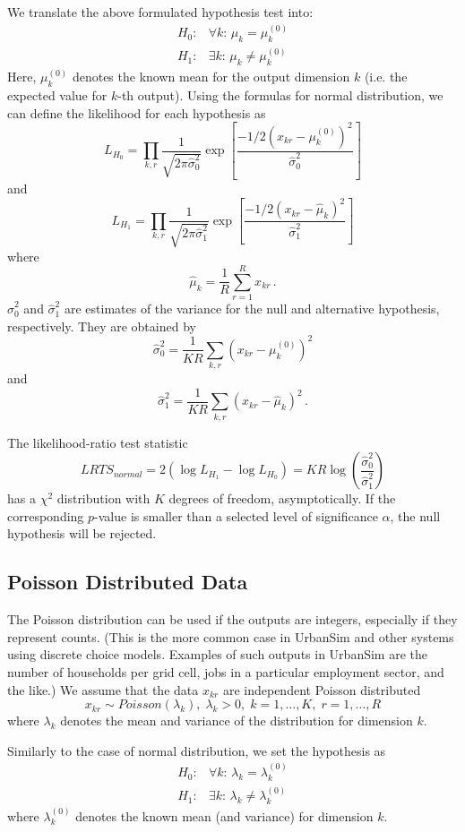 \documentclass{sig-alternate-preprint}
\begin{document}
We translate the above formulated hypothesis test into:
\[
\begin{array}{lc}
H_0: & \forall k: \, \mu_{k} = \mu_{k}^{(0)}\\
H_1: & \exists k: \, \mu_{k} \not= \mu_{k}^{(0)}
\end{array}
\]
Here, $\mu_{k}^{(0)}$ denotes the known mean for the output dimension $k$
(i.e. the expected value for $k$-th output). Using the formulas for normal distribution,
we can define the likelihood for each hypothesis as
\[
L_{H_0} = \prod_{k,r}\frac{1}{\sqrt{2\pi\hat{\sigma}_0^2}} \exp\left[ \frac{-1/2(x_{kr}-\mu_{k}^{(0)})^2}{\hat{\sigma}_0^2}\right]
\]
and
\[
L_{H_1} = \prod_{k,r}\frac{1}{\sqrt{2\pi\hat{\sigma}_1^2}} \exp\left[
  \frac{-1/2(x_{kr}-\hat{\mu}_{k})^2}{\hat{\sigma}_1^2}\right]
\]
where
\[
\hat{\mu}_{k} = \frac{1}{R}\sum_{r=1}^R x_{kr}\,.
\]
$\hat{\sigma}_0^2$ and $\hat{\sigma}_1^2$ are estimates of the
variance for the null and alternative hypothesis, respectively. They are
obtained by
\[
\hat{\sigma}_0^2 = \frac{1}{KR}\sum_{k,r}(x_{kr}-\mu_{k}^{(0)})^2
\]
and
\[
\hat{\sigma}_1^2 = \frac{1}{KR}\sum_{k,r}(x_{kr}-\hat{\mu}_{k})^2\,.
\]

The likelihood-ratio test statistic
\[
LRTS_{normal} = 2(\log L_{H_1} - \log L_{H_0}) = KR
\log\left(\frac{\hat{\sigma}_0^2}{\hat{\sigma}_1^2}\right)
\]
has a $\chi^2$ distribution with $K$
degrees of freedom, asymptotically. If the corresponding $p$-value is smaller than a selected level
of significance $\alpha$, the null hypothesis
will be rejected.

%
\subsection{Poisson Distributed Data}
\label{sec:poisson}
%
The Poisson distribution can be used if the outputs are integers,
especially if they represent counts.  (This is the more common case in
UrbanSim and other systems using discrete choice models.  Examples of such
outputs in UrbanSim are the number of households per grid cell, jobs in a
particular employment sector, and the like.)  We assume that the data $x_{kr}$
are independent Poisson distributed
\[
x_{kr} \sim Poisson(\lambda_k),\; \lambda_k>0, \; k=1,\dots, K,\; r=1,\dots,R
\]
where $\lambda_k$ denotes the mean and variance of the distribution for
dimension $k$.

Similarly to the case of normal distribution, we set the hypothesis as
\[
\begin{array}{lc}
H_0: & \forall k: \, \lambda_{k} = \lambda_{k}^{(0)}\\
H_1: & \exists k: \, \lambda_{k} \not= \lambda_{k}^{(0)}
\end{array}
\]
where $\lambda_{k}^{(0)}$ denotes the known mean (and variance)
for dimension $k$.
\end{document}
